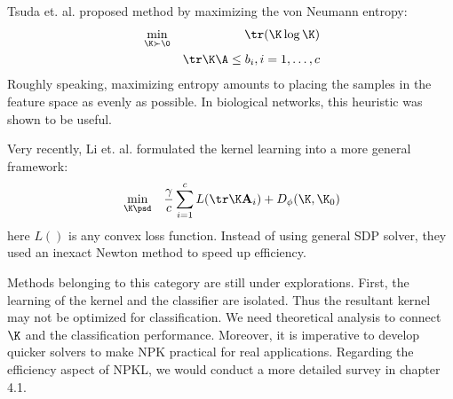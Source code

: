 Tsuda et. al. proposed method by maximizing the von Neumann entropy\cite{ismb/TsudaN04}:
\begin{eqnarray}
&\min_{\K\succ\0}& \tr(\K\log\K)\\
&&  \tr \K\A\leq b_i,i=1,\ldots,c
\end{eqnarray}
Roughly speaking, maximizing entropy amounts to placing the samples in the feature space as evenly as possible. In biological networks, this heuristic was shown to be useful.

Very recently, Li et. al. formulated the kernel learning into a more general framework:
\begin{eqnarray}
&\min_{\K\psd}& \frac{\gamma}{c}\sum_{i=1}^c L(\tr\K\mathbf A_i)+D_{\phi}(\K,\K_0)
\end{eqnarray}
here $L()$ is any convex loss function. Instead of using general SDP solver, they used an inexact Newton method to speed up efficiency.

Methods belonging to this category are still under explorations. First, the learning of the kernel and the classifier are isolated. Thus the resultant kernel may not be optimized for classification. We need theoretical analysis to connect $\K$ and the classification performance. Moreover, it is imperative to develop quicker solvers to make NPK practical for real applications. Regarding the efficiency aspect of NPKL, we would conduct a more detailed survey in chapter 4.1.

